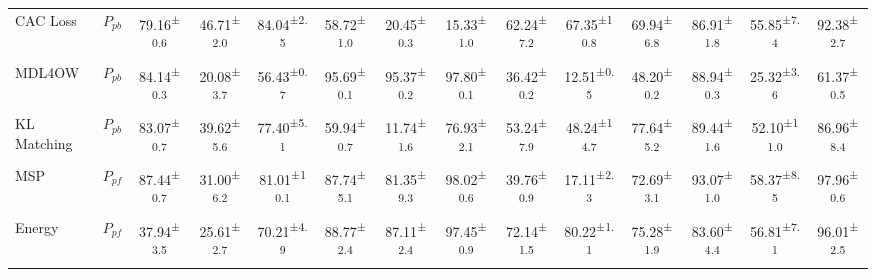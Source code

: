 \begin{table*}[!t]
{\begin{tabular}{lccccccccccccc}
    CAC Loss~\cite{CACLoss}                                     & $P_{pb}$               & 79.16\textsuperscript{±0.6}          & 46.71\textsuperscript{±2.0}          & 84.04\textsuperscript{±2.5}          & 58.72\textsuperscript{±1.0}          & 20.45\textsuperscript{±0.3}          & 15.33\textsuperscript{±1.0}          & 62.24\textsuperscript{±7.2}          & 67.35\textsuperscript{±10.8}         & 69.94\textsuperscript{±6.8}          & 86.91\textsuperscript{±1.8}          & 55.85\textsuperscript{±7.4}          & 92.38\textsuperscript{±2.7}           \\
    MDL4OW~\cite{MDL4OW}                                       & $P_{pb}$               & 84.14\textsuperscript{±0.3}          & 20.08\textsuperscript{±3.7}          & 56.43\textsuperscript{±0.7}          & 95.69\textsuperscript{±0.1}          & 95.37\textsuperscript{±0.2}          & 97.80\textsuperscript{±0.1}          & 36.42\textsuperscript{±0.2}          & 12.51\textsuperscript{±0.5}          & 48.20\textsuperscript{±0.2}          & 88.94\textsuperscript{±0.3}          & 25.32\textsuperscript{±3.6}          & 61.37\textsuperscript{±0.5}           \\
    KL Matching~\cite{KLMatching}                                  & $P_{pb}$               & 83.07\textsuperscript{±0.7}          & 39.62\textsuperscript{±5.6}          & 77.40\textsuperscript{±5.1}          & 59.94\textsuperscript{±0.7}          & 11.74\textsuperscript{±1.6}          & 76.93\textsuperscript{±2.1}          & 53.24\textsuperscript{±7.9}          & 48.24\textsuperscript{±14.7}         & 77.64\textsuperscript{±5.2}          & 89.44\textsuperscript{±1.6}          & 52.10\textsuperscript{±11.0}         & 86.96\textsuperscript{±8.4}           \\
    MSP~\cite{MSP}                                          & $P_{pf}$               & 87.44\textsuperscript{±0.7}          & 31.00\textsuperscript{±6.2}          & 81.01\textsuperscript{±10.1}         & 87.74\textsuperscript{±5.1}          & 81.35\textsuperscript{±9.3}          & 98.02\textsuperscript{±0.6}          & 39.76\textsuperscript{±0.9}          & 17.11\textsuperscript{±2.3}          & 72.69\textsuperscript{±3.1}          & 93.07\textsuperscript{±1.0}          & 58.37\textsuperscript{±8.5}          & 97.96\textsuperscript{±0.6}           \\
    Energy~\cite{Energy}                                       & $P_{pf}$               & 37.94\textsuperscript{±3.5}          & 25.61\textsuperscript{±2.7}          & 70.21\textsuperscript{±4.9}          & 88.77\textsuperscript{±2.4}          & 87.11\textsuperscript{±2.4}          & 97.45\textsuperscript{±0.9}          & 72.14\textsuperscript{±1.5}          & 80.22\textsuperscript{±1.1}          & 75.28\textsuperscript{±1.9}          & 83.60\textsuperscript{±4.4}          & 56.81\textsuperscript{±7.1}          & 96.01\textsuperscript{±2.5}           \\

\end{tabular}}
\end{table*}
